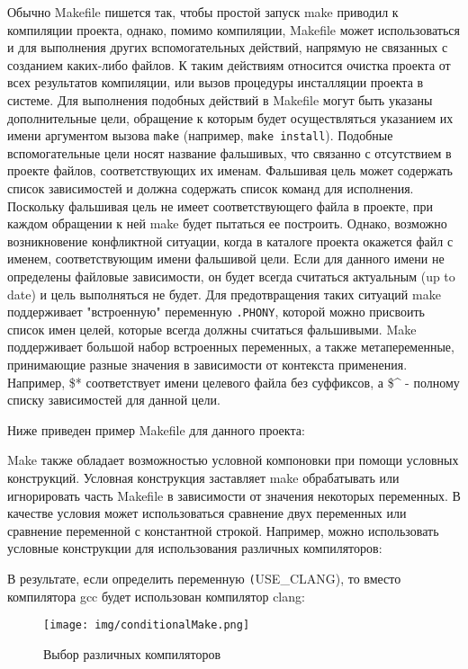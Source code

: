 Обычно Makefile пишется так, чтобы простой запуск make приводил к компиляции проекта, однако, помимо компиляции,
Makefile может использоваться и для выполнения других вспомогательных действий, напрямую не связанных с созданием каких-либо файлов.
К таким действиям относится очистка проекта от всех результатов компиляции, или вызов процедуры инсталляции проекта в системе.
Для выполнения подобных действий в Makefile могут быть указаны дополнительные цели, обращение к которым будет осуществляться указанием их имени аргументом вызова \texttt{make}
(например, \texttt{make install}). Подобные вспомогательные цели носят название фальшивых, что связанно с отсутствием в проекте файлов, соответствующих их именам.
Фальшивая цель может содержать список зависимостей и должна содержать список команд для исполнения.
Поскольку фальшивая цель не имеет соответствующего файла в проекте, при каждом обращении к ней make будет пытаться ее построить.
Однако, возможно возникновение конфликтной ситуации, когда в каталоге проекта окажется файл с именем, соответствующим имени фальшивой цели.
Если для данного имени не определены файловые зависимости, он будет всегда считаться актуальным (up to date) и цель выполняться не будет.
Для предотвращения таких ситуаций make поддерживает "встроенную" переменную \texttt{.PHONY}, которой можно присвоить список имен целей, которые всегда должны считаться фальшивыми.
Make поддерживает большой набор встроенных переменных, а также метапеременные, принимающие разные значения в зависимости от контекста применения.
Например, \$* соответствует имени целевого файла без суффиксов, а \$\^{} - полному списку зависимостей для данной цели.

Ниже приведен пример Makefile для данного проекта:


Make также обладает возможностью условной компоновки при помощи условных конструкций.
Условная конструкция заставляет make обрабатывать или игнорировать часть Makefile в зависимости от значения некоторых переменных.
В качестве условия может использоваться сравнение двух переменных или сравнение переменной с константной строкой.
Например, можно использовать условные конструкции для использования различных компиляторов:



В результате, если определить переменную \texttt(USE\_CLANG), то вместо компилятора gcc будет использован компилятор clang:

\begin{figure}[h]
  \centering
    \texttt{[image: img/conditionalMake.png]}
  \caption{Выбор различных компиляторов}
\end{figure}
